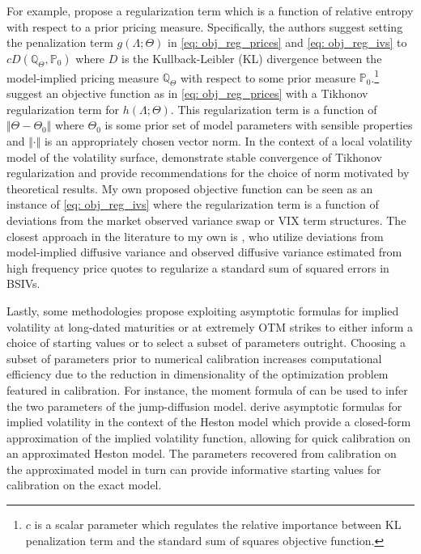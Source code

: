 \documentclass[12pt]{article}
\begin{document}
For example, \cite{cont2004nonparametric} propose a regularization term which is a function of relative entropy with respect to a prior pricing measure. Specifically, the authors suggest setting the penalization term $g(\Lambda; \Theta)$ in \eqref{eq: obj_reg_prices} and \eqref{eq: obj_reg_ivs} to $cD(\mathbb{Q}_\Theta, \mathbb{P}_0)$ where $D$ is the Kullback-Leibler (KL) divergence between the model-implied pricing measure $\mathbb{Q}_\Theta$ with respect to some prior measure $\mathbb{P}_0$.\footnote{$c$ is a scalar parameter which regulates the relative importance between KL penalization term and the standard sum of squares objective function.} \cite{lagnado1997technique} suggest an objective function as in \eqref{eq: obj_reg_prices} with a Tikhonov regularization term for $h(\Lambda; \Theta)$. This regularization term is a function of $\Vert \Theta - \Theta_0\Vert$ where $\Theta_0$ is some prior set of model parameters with sensible properties and $\Vert \cdot \Vert$ is an appropriately chosen vector norm. In the context of a local volatility model of the volatility surface, \cite{egger2005tikhonov} demonstrate stable convergence of Tikhonov regularization and provide recommendations for the choice of norm motivated by theoretical results. My own proposed objective function can be seen as an instance of \eqref{eq: obj_reg_ivs} where the regularization term is a function of deviations from the market observed variance swap or VIX term structures. The closest approach in the literature to my own is \cite{andersen2015parametric}, who utilize deviations from model-implied diffusive variance and observed diffusive variance estimated from high frequency price quotes to regularize a standard sum of squared errors in BSIVs.

Lastly, some methodologies propose exploiting asymptotic formulas for implied volatility at long-dated maturities or at extremely OTM strikes to either inform a choice of starting values or to select a subset of parameters outright. Choosing a subset of parameters prior to numerical calibration increases computational efficiency due to the reduction in dimensionality of the optimization problem featured in calibration. For instance, the moment formula of \cite{lee2004option} can be used to infer the two parameters of the \cite{kou2002jump} jump-diffusion model. \cite{forde2010asymptotic} derive asymptotic formulas for implied volatility in the context of the Heston model which provide a closed-form approximation of the implied volatility function, allowing for quick calibration on an approximated Heston model. The parameters recovered from calibration on the approximated model in turn can provide informative starting values for calibration on the exact model. 
\end{document}
